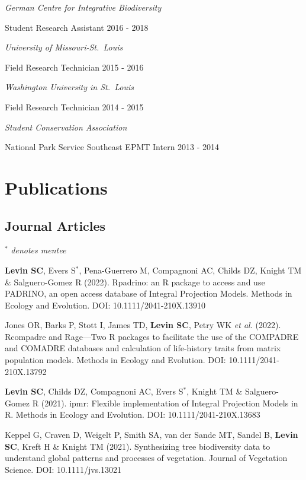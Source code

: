 \documentclass[11pt,]{article}
\begin{document}
\emph{German Centre for Integrative Biodiversity}

Student Research Assistant \hfill 2016 - 2018

\emph{University of Missouri-St.~Louis}

Field Research Technician \hfill 2015 - 2016

\emph{Washington University in St.~Louis}

Field Research Technician \hfill 2014 - 2015

\emph{Student Conservation Association}

National Park Service Southeast EPMT Intern \hfill 2013 - 2014

\newpage

\hypertarget{publications}{%
\section{Publications}\label{publications}}

\hypertarget{journal-articles}{%
\subsection{Journal Articles}\label{journal-articles}}

\(^\ast\) \emph{denotes mentee}

\textbf{Levin SC}, Evers S\(^\ast\), Pena-Guerrero M, Compagnoni AC,
Childs DZ, Knight TM \& Salguero-Gomez R (2022). Rpadrino: an R package
to access and use PADRINO, an open access database of Integral
Projection Models. Methods in Ecology and Evolution. DOI:
10.1111/2041-210X.13910

Jones OR, Barks P, Stott I, James TD, \textbf{Levin SC}, Petry WK
\emph{et al.} (2022). Rcompadre and Rage---Two R packages to facilitate
the use of the COMPADRE and COMADRE databases and calculation of
life-history traits from matrix population models. Methods in Ecology
and Evolution. DOI: 10.1111/2041-210X.13792

\textbf{Levin SC}, Childs DZ, Compagnoni AC, Evers S\(^\ast\), Knight TM
\& Salguero-Gomez R (2021). ipmr: Flexible implementation of Integral
Projection Models in R. Methods in Ecology and Evolution. DOI:
10.1111/2041-210X.13683

Keppel G, Craven D, Weigelt P, Smith SA, van der Sande MT, Sandel B,
\textbf{Levin SC}, Kreft H \& Knight TM (2021). Synthesizing tree
biodiversity data to understand global patterns and processes of
vegetation. Journal of Vegetation Science. DOI: 10.1111/jvs.13021
\end{document}

